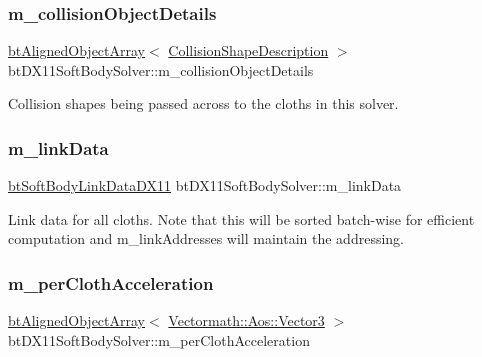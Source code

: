 \subsubsection{\texorpdfstring{m\+\_\+collision\+Object\+Details}{m\_collisionObjectDetails}}
{\footnotesize\ttfamily \hyperlink{classbtAlignedObjectArray}{bt\+Aligned\+Object\+Array}$<$ \hyperlink{structbtDX11SoftBodySolver_1_1CollisionShapeDescription}{Collision\+Shape\+Description} $>$ bt\+D\+X11\+Soft\+Body\+Solver\+::m\+\_\+collision\+Object\+Details\hspace{0.3cm}{\ttfamily [protected]}}

Collision shapes being passed across to the cloths in this solver. \mbox{\label{classbtDX11SoftBodySolver_a0477894bad3bbed9dcfd7922baeb782d}} 
\subsubsection{\texorpdfstring{m\+\_\+link\+Data}{m\_linkData}}
{\footnotesize\ttfamily \hyperlink{classbtSoftBodyLinkDataDX11}{bt\+Soft\+Body\+Link\+Data\+D\+X11} bt\+D\+X11\+Soft\+Body\+Solver\+::m\+\_\+link\+Data}

Link data for all cloths. Note that this will be sorted batch-\/wise for efficient computation and m\+\_\+link\+Addresses will maintain the addressing. \mbox{\label{classbtDX11SoftBodySolver_a78b69812eb1dad36cc177d2b5b22dd15}} 
\subsubsection{\texorpdfstring{m\+\_\+per\+Cloth\+Acceleration}{m\_perClothAcceleration}}
{\footnotesize\ttfamily \hyperlink{classbtAlignedObjectArray}{bt\+Aligned\+Object\+Array}$<$ \hyperlink{classVectormath_1_1Aos_1_1Vector3}{Vectormath\+::\+Aos\+::\+Vector3} $>$ bt\+D\+X11\+Soft\+Body\+Solver\+::m\+\_\+per\+Cloth\+Acceleration\hspace{0.3cm}{\ttfamily [protected]}}

